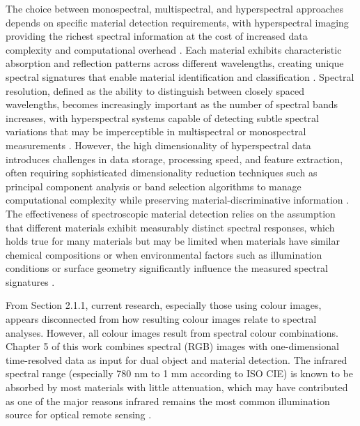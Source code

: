 \documentclass[12pt,a4paper,oneside]{report}
\begin{document}
The choice between monospectral, multispectral, and hyperspectral approaches depends on specific material detection requirements, with hyperspectral imaging providing the richest spectral information at the cost of increased data complexity and computational overhead \cite{heinz2001,vasile2023}. Each material exhibits characteristic absorption and reflection patterns across different wavelengths, creating unique spectral signatures that enable material identification and classification \cite{holt2016,elachi2021}. Spectral resolution, defined as the ability to distinguish between closely spaced wavelengths, becomes increasingly important as the number of spectral bands increases, with hyperspectral systems capable of detecting subtle spectral variations that may be imperceptible in multispectral or monospectral measurements \cite{heinz2001,vasile2023}. However, the high dimensionality of hyperspectral data introduces challenges in data storage, processing speed, and feature extraction, often requiring sophisticated dimensionality reduction techniques such as principal component analysis or band selection algorithms to manage computational complexity while preserving material-discriminative information \cite{heinz2001,wold1987,bishop2006}. The effectiveness of spectroscopic material detection relies on the assumption that different materials exhibit measurably distinct spectral responses, which holds true for many materials but may be limited when materials have similar chemical compositions or when environmental factors such as illumination conditions or surface geometry significantly influence the measured spectral signatures \cite{schwartz2013,sharan2013,elachi2021}.

From Section 2.1.1, current research, especially those using colour images, appears disconnected from how resulting colour images relate to spectral analyses. However, all colour images result from spectral colour combinations. Chapter 5 of this work combines spectral (RGB) images with one-dimensional time-resolved data as input for dual object and material detection. The infrared spectral range (especially 780 nm to 1 mm according to ISO CIE) is known to be absorbed by most materials with little attenuation, which may have contributed as one of the major reasons infrared remains the most common illumination source for optical remote sensing \cite{elachi2021,bass2010,schott2007}.
\end{document}
